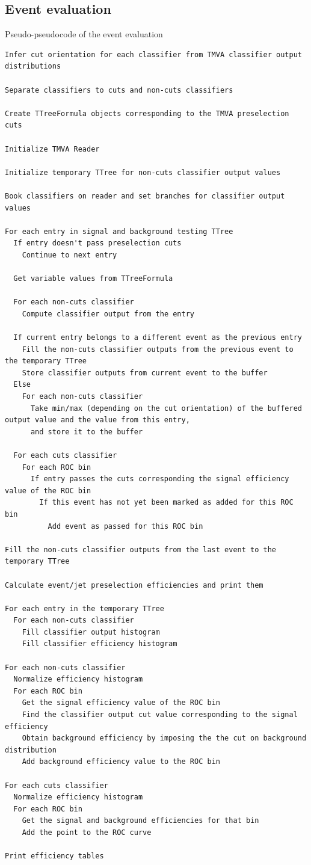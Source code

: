 \documentclass[a4paper]{jpconf}
\begin{document}
\subsection{Event evaluation}
Pseudo-pseudocode of the event evaluation
\scriptsize
\begin{verbatim}
Infer cut orientation for each classifier from TMVA classifier output distributions

Separate classifiers to cuts and non-cuts classifiers

Create TTreeFormula objects corresponding to the TMVA preselection cuts

Initialize TMVA Reader

Initialize temporary TTree for non-cuts classifier output values

Book classifiers on reader and set branches for classifier output values

For each entry in signal and background testing TTree
  If entry doesn't pass preselection cuts
    Continue to next entry

  Get variable values from TTreeFormula

  For each non-cuts classifier
    Compute classifier output from the entry

  If current entry belongs to a different event as the previous entry
    Fill the non-cuts classifier outputs from the previous event to the temporary TTree
    Store classifier outputs from current event to the buffer
  Else
    For each non-cuts classifier
      Take min/max (depending on the cut orientation) of the buffered output value and the value from this entry,
      and store it to the buffer

  For each cuts classifier
    For each ROC bin
      If entry passes the cuts corresponding the signal efficiency value of the ROC bin
        If this event has not yet been marked as added for this ROC bin
          Add event as passed for this ROC bin

Fill the non-cuts classifier outputs from the last event to the temporary TTree

Calculate event/jet preselection efficiencies and print them

For each entry in the temporary TTree
  For each non-cuts classifier
    Fill classifier output histogram
    Fill classifier efficiency histogram

For each non-cuts classifier
  Normalize efficiency histogram
  For each ROC bin
    Get the signal efficiency value of the ROC bin
    Find the classifier output cut value corresponding to the signal efficiency
    Obtain background efficiency by imposing the the cut on background distribution
    Add background efficiency value to the ROC bin

For each cuts classifier
  Normalize efficiency histogram
  For each ROC bin
    Get the signal and background efficiencies for that bin
    Add the point to the ROC curve 

Print efficiency tables
\end{verbatim}
\normalsize
\end{document}
